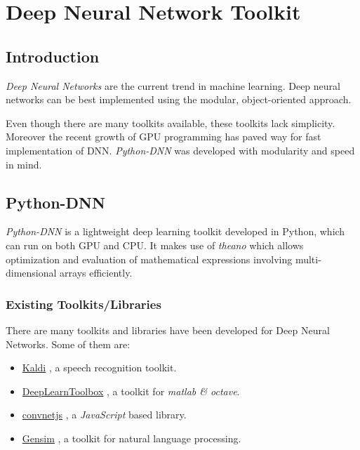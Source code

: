 \chapter{Deep Neural Network Toolkit} 
\label{chap:toolkit}
\section{Introduction}
\textit{Deep Neural Networks} are the current trend in machine learning.  Deep neural networks can be best implemented using the modular, object-oriented approach. 

Even though there are many toolkits available, these toolkits lack simplicity.  Moreover the recent growth of GPU programming has paved way for fast implementation of DNN. \textit{Python-DNN} was developed with modularity and speed in mind.

\section{Python-DNN}
\textit{Python-DNN} is a lightweight deep learning toolkit developed in Python, which can run on both GPU and CPU.  It makes use of \emph{theano}  \cite{bergstra2010theano} which allows optimization and evaluation of mathematical expressions involving multi-dimensional arrays efficiently.

\subsection{Existing Toolkits/Libraries}
There are many toolkits and libraries have been developed for Deep Neural Networks.  Some of them are: 
\begin{itemize}
\item \href{http://kaldi.sourceforge.net/}{Kaldi} \citep{Povey_ASRU2011}, a speech recognition toolkit.
\item \href{https://github.com/rasmusbergpalm/DeepLearnToolbox}{DeepLearnToolbox} \citep{IMM2012-06284}, a toolkit for \textit{matlab \& octave}.
\item \href{http://cs.stanford.edu/people/karpathy/convnetjs/}{convnetjs} \citep{convnetjs} , a \textit{JavaScript}  based library.
\item \href{https://radimrehurek.com/gensim}{Gensim} \citep{rehurek_lrec}, a toolkit for natural language processing.
\end{itemize}

